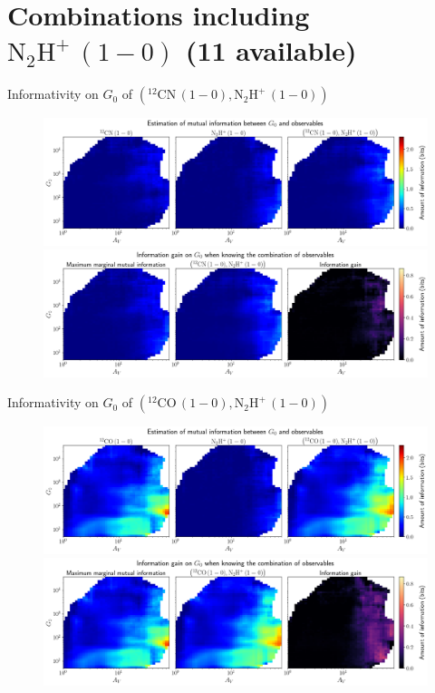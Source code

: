 \documentclass{beamer}
\begin{document}
\section{Combinations including $\mathrm{N_2H^+\,(1-0)}$ (11 available)}

\begin{frame}{Informativity on $G_0$ of $\left(\mathrm{^{12}CN\,(1-0)},\mathrm{N_2H^+\,(1-0)}\right)$}
    \begin{figure}
        \centering
        \includegraphics[width=0.95\linewidth]{../mi/g0__12cn10_n2hp10_mi.png}
        \vfill
        \includegraphics[width=0.95\linewidth]{../mi/g0__12cn10_n2hp10_mi_gain.png}
    \end{figure}
\end{frame}

\begin{frame}{Informativity on $G_0$ of $\left(\mathrm{^{12}CO\,(1-0)},\mathrm{N_2H^+\,(1-0)}\right)$}
    \begin{figure}
        \centering
        \includegraphics[width=0.95\linewidth]{../mi/g0__12co10_n2hp10_mi.png}
        \vfill
        \includegraphics[width=0.95\linewidth]{../mi/g0__12co10_n2hp10_mi_gain.png}
    \end{figure}
\end{frame}
\end{document}
